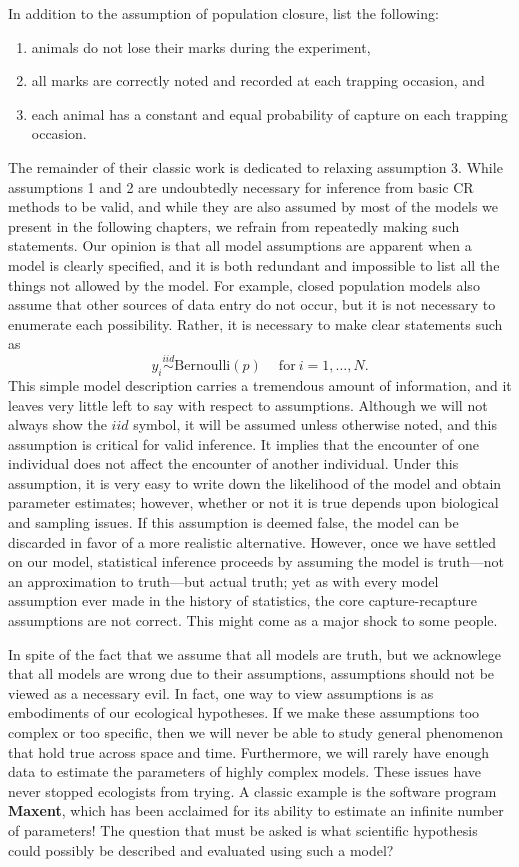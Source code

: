 In addition to the assumption of population closure,
\citet{otis_etal:1978} list the following:
\begin{enumerate}
  \item animals do not lose their marks during the experiment,
  \item all marks are correctly noted and recorded at each trapping
    occasion, and
  \item each animal has a constant and equal probability of capture on
    each trapping occasion.
\end{enumerate}
The remainder of their classic work is dedicated to relaxing
assumption 3. While assumptions 1 and 2 are undoubtedly necessary for
inference from basic CR methods to be valid, and while they are
also assumed by most of the models we present in the following
chapters, we refrain from repeatedly making such statements. Our
opinion is that all model assumptions are apparent when a model is
clearly specified, and it is both redundant and impossible to list all
the things not allowed by the model. For example, closed population
models also assume that other sources of data entry do not occur, but
it is not necessary to enumerate each possibility. Rather, it is
necessary to make clear statements such as
\[
y_i \stackrel{iid}{\sim} \text{Bernoulli}(p) \quad \: \text{for}\: i=1,\ldots,N.
\]
This simple model description carries a tremendous amount of
information, and it leaves very little left to say with respect to
assumptions. Although we will not always show the $iid$ symbol, it
will be assumed unless otherwise noted, and this assumption is
critical for valid inference. It implies that the encounter of one
individual does not affect the encounter of another
individual. Under this assumption, it is very easy to write down the
likelihood of the model and obtain parameter estimates; however,
whether or not it is true depends upon biological and sampling
issues. If this assumption is deemed false, the model can be discarded
in favor of a more realistic alternative. However, once we have
settled on our model, statistical inference proceeds by assuming the
model is truth---not an approximation to truth---but actual
truth; yet as with every model assumption ever made in the history of
statistics, the core capture-recapture assumptions are not correct. This might
come as a major shock to some people.

In spite of the fact that we assume that all models are truth, but we
acknowlege that all models are wrong due to their assumptions,
assumptions should not be viewed as a necessary evil. In fact, one way
to view assumptions is as embodiments of our ecological hypotheses. If
we make these assumptions too complex or too specific, then we will
never be able to study general phenomenon that hold true across space
and time. Furthermore, we will rarely have enough data to estimate the
parameters of highly complex models. These issues have never stopped
ecologists from trying. A classic example is the software program
\textbf{Maxent}, which has been acclaimed for its ability to estimate
an infinite number of parameters! The question that must be asked is
what scientific hypothesis could possibly be described and evaluated
using such a model?

